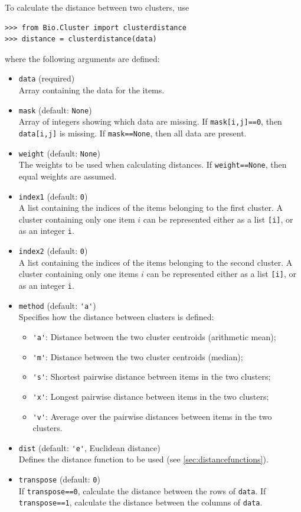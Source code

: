 \documentclass{report}
\begin{document}
To calculate the distance between two clusters, use
\begin{verbatim}
>>> from Bio.Cluster import clusterdistance
>>> distance = clusterdistance(data)
\end{verbatim}
where the following arguments are defined:
\begin{itemize}
\item \verb|data| (required)\\
Array containing the data for the items.
\item \verb|mask| (default: \verb|None|) \\
Array of integers showing which data are missing. If \verb|mask[i,j]==0|, then \verb|data[i,j]| is missing. If \verb|mask==None|, then all data are present.
\item \verb|weight| (default: \verb|None|) \\
The weights to be used when calculating distances. If \verb|weight==None|, then equal weights are assumed.
\item \verb|index1| (default: \verb|0|) \\
A list containing the indices of the items belonging to the first cluster. A cluster containing only one item $i$ can be represented either as a list \verb|[i]|, or as an integer \verb|i|.
\item \verb|index2| (default: \verb|0|) \\
A list containing the indices of the items belonging to the second cluster. A cluster containing only one items $i$ can be represented either as a list \verb|[i]|, or as an integer \verb|i|.
\item \verb|method| (default: \verb|'a'|) \\
Specifies how the distance between clusters is defined:
\begin{itemize}
\item \verb|'a'|: Distance between the two cluster centroids (arithmetic mean);
\item \verb|'m'|: Distance between the two cluster centroids (median);
\item \verb|'s'|: Shortest pairwise distance between items in the two clusters;
\item \verb|'x'|: Longest pairwise distance between items in the two clusters;
\item \verb|'v'|: Average over the pairwise distances between items in the two clusters.
\end{itemize}
\item \verb|dist| (default: \verb|'e'|, Euclidean distance) \\
Defines the distance function to be used (see \ref{sec:distancefunctions}).
\item \verb|transpose| (default: \verb|0|) \\
If \verb|transpose==0|, calculate the distance between the rows of \verb|data|. If \verb|transpose==1|, calculate the distance between the columns of \verb|data|.
\end{itemize}
\end{document}

